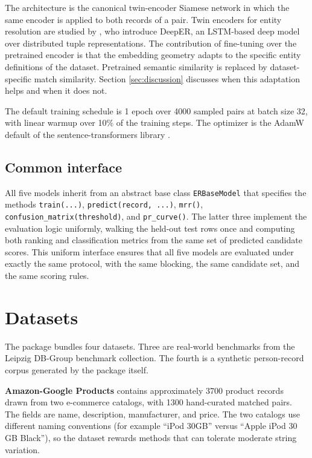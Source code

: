 \documentclass[10pt,letterpaper]{article}
\begin{document}
The architecture is the canonical twin-encoder Siamese network in
which the same encoder is applied to both records of a pair. Twin
encoders for entity resolution are studied by \citet{ebraheem2018},
who introduce DeepER, an LSTM-based deep model over distributed tuple
representations. The contribution of fine-tuning over the pretrained
encoder is that the embedding geometry adapts to the specific entity
definitions of the dataset. Pretrained semantic similarity is replaced
by dataset-specific match similarity. Section \ref{sec:discussion}
discusses when this adaptation helps and when it does not.

The default training schedule is 1 epoch over 4000 sampled pairs at
batch size 32, with linear warmup over 10\% of the training steps.
The optimizer is the AdamW default of the sentence-transformers
library \citep{loshchilov2019}.

\subsection{Common interface}

All five models inherit from an abstract base class
\texttt{ERBaseModel} that specifies the methods \texttt{train(...)},
\texttt{predict(record, ...)}, \texttt{mrr()},
\texttt{confusion\_matrix(threshold)}, and
\texttt{pr\_curve()}. The latter three implement the evaluation
logic uniformly, walking the held-out test rows once and computing
both ranking and classification metrics from the same set of predicted
candidate scores. This uniform interface ensures that all five models
are evaluated under exactly the same protocol, with the same blocking,
the same candidate set, and the same scoring rules.

\section{Datasets}
\label{sec:datasets}

The package bundles four datasets. Three are real-world benchmarks
from the Leipzig DB-Group benchmark collection. The fourth is a
synthetic person-record corpus generated by the package itself.

\textbf{Amazon-Google Products} contains approximately 3700 product
records drawn from two e-commerce catalogs, with 1300 hand-curated
matched pairs. The fields are name, description, manufacturer, and
price. The two catalogs use different naming conventions (for example
``iPod 30GB'' versus ``Apple iPod 30 GB Black''), so the dataset
rewards methods that can tolerate moderate string variation.
\end{document}
